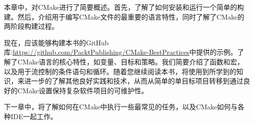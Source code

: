 本章中，对CMake进行了简要概述。首先，了解了如何安装和运行一个简单的构建。然后，介绍用于编写CMake文件的最重要的语言特性，同时了解了CMake的两阶段构建过程。

现在，应该能够构建本书的GitHub库:\url{https://github.com/PacktPublishing/CMake-BestPractices}中提供的示例。了解了CMake语言的核心特性，如变量、目标和策略。我们简要介绍了函数和宏，以及用于流控制的条件语句和循环。随着您继续阅读本书，将使用到所学到的知识，来进一步的了解其他良好实践和技术，从而从简单的单目标项目转移到通过良好的CMake设置保持复杂软件项目的可维护性。

下一章中，将了解如何在CMake中执行一些最常见的任务，以及CMake如何与各种IDE一起工作。